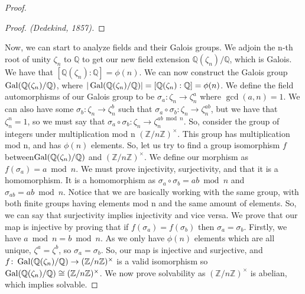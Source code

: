 \documentclass[12pt]{extarticle}
\theoremstyle{definition}
\begin{document}
\begin{proof}
\begin{proof}[Proof. (Dedekind, 1857)]
\end{proof}
Now, we can start to analyze fields and their Galois groups. We adjoin the n-th root of unity $\zeta_n$ to $\mathbb{Q}$ to get our new field extension $\mathbb{Q}(\zeta_n)/\mathbb{Q}$, which is Galois. We have that $[\mathbb{Q}(\zeta_n) :\mathbb{Q}] = \phi(n)$. We can now construct the Galois group $\operatorname{Gal}(\mathbb{Q}(\zeta_n)/\mathbb{Q})$, where $|\operatorname{Gal}(\mathbb{Q}(\zeta_n)/\mathbb{Q})| = [\mathbb{Q}(\zeta_n) :\mathbb{Q}] = \phi(n)$. We define the field automorphisms of our Galois group to be $\sigma_a \colon \zeta_n \to \zeta^a_n$ where $\gcd(a,n) = 1$.
We can also have some $\sigma_b \colon \zeta_n \to \zeta^b_n$ such that $\sigma_a \circ \sigma_b \colon \zeta_n \to \zeta_n^{ab}$, but we have that $\zeta^n_n =1$, so we must say that $\sigma_a \circ \sigma_b \colon \zeta_n \to \zeta_n^{ab\bmod n}$. So, consider the group of integers under multiplication mod n $(\mathbb{Z}/n\mathbb{Z})^{\times}$. This group has multiplication mod n, and has $\phi(n)$ elements. So, let us try to find a group isomorphism $f$ between$\operatorname{Gal}(\mathbb{Q}(\zeta_n)/\mathbb{Q})$ and $(\mathbb{Z}/n\mathbb{Z})^{\times}$. We define our morphism as $f(\sigma_a) = a\bmod n$. We must prove injectivity, surjectivity, and that it is a homomorphism. It is a homomorphism as $\sigma_a \circ \sigma_b = ab\bmod n$ and $\sigma_{ab} = ab\bmod n$. Notice that we are basically working with the same group, with both finite groups having elements mod n and the same amount of elements. So, we can say that surjectivity implies injectivity and vice versa. We prove that our map is injective by proving that if $f(\sigma_a) = f(\sigma_b)$ then $\sigma_a = \sigma_b$. Firstly, we have $a \bmod n = b \bmod n$. As we only have $\phi(n)$ elements which are all unique, $\zeta^a =\zeta^b$, so $\sigma_a = \sigma_b$. So, our map is injective and surjective, and $f \colon \operatorname{Gal}(\mathbb{Q}(\zeta_n)/\mathbb{Q}) \to (\mathbb{Z}/n\mathbb{Z})^{\times} $ is a valid isomorphism so $\operatorname{Gal}(\mathbb{Q}(\zeta_n)/\mathbb{Q})\cong (\mathbb{Z}/n\mathbb{Z})^{\times}$. We now prove solvability as  $(\mathbb{Z}/n\mathbb{Z})^{\times}$ is abelian, which implies solvable.




























\end{proof}
\end{document}

